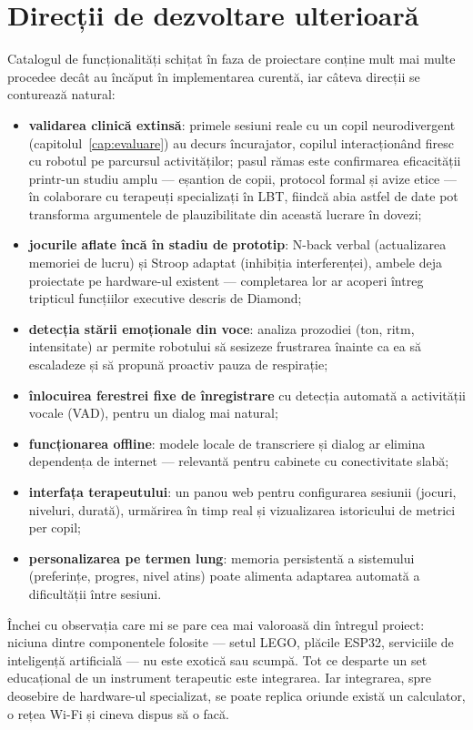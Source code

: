 \section{Direcții de dezvoltare ulterioară}

Catalogul de funcționalități schițat în faza de proiectare conține mult mai multe procedee decât au încăput în implementarea curentă, iar câteva direcții se conturează natural:

\begin{itemize}
    \item \textbf{validarea clinică extinsă}: primele sesiuni reale cu un copil neurodivergent (capitolul~\ref{cap:evaluare}) au decurs încurajator, copilul interacționând firesc cu robotul pe parcursul activităților; pasul rămas este confirmarea eficacității printr-un studiu amplu — eșantion de copii, protocol formal și avize etice — în colaborare cu terapeuți specializați în LBT, fiindcă abia astfel de date pot transforma argumentele de plauzibilitate din această lucrare în dovezi;
    \item \textbf{jocurile aflate încă în stadiu de prototip}: N-back verbal (actualizarea memoriei de lucru) și Stroop adaptat (inhibiția interferenței), ambele deja proiectate pe hardware-ul existent — completarea lor ar acoperi întreg tripticul funcțiilor executive descris de Diamond;
    \item \textbf{detecția stării emoționale din voce}: analiza prozodiei (ton, ritm, intensitate) ar permite robotului să sesizeze frustrarea înainte ca ea să escaladeze și să propună proactiv pauza de respirație;
    \item \textbf{înlocuirea ferestrei fixe de înregistrare} cu detecția automată a activității vocale (VAD), pentru un dialog mai natural;
    \item \textbf{funcționarea offline}: modele locale de transcriere și dialog ar elimina dependența de internet — relevantă pentru cabinete cu conectivitate slabă;
    \item \textbf{interfața terapeutului}: un panou web pentru configurarea sesiunii (jocuri, niveluri, durată), urmărirea în timp real și vizualizarea istoricului de metrici per copil;
    \item \textbf{personalizarea pe termen lung}: memoria persistentă a sistemului (preferințe, progres, nivel atins) poate alimenta adaptarea automată a dificultății între sesiuni.
\end{itemize}

Închei cu observația care mi se pare cea mai valoroasă din întregul proiect: niciuna dintre componentele folosite — setul LEGO, plăcile ESP32, serviciile de inteligență artificială — nu este exotică sau scumpă. Tot ce desparte un set educațional de un instrument terapeutic este integrarea. Iar integrarea, spre deosebire de hardware-ul specializat, se poate replica oriunde există un calculator, o rețea Wi-Fi și cineva dispus să o facă.
